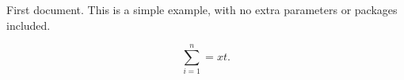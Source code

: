 \documentclass{article}
\begin{document}
First document. This is a simple example, with no 
extra parameters or packages included.

    \[
        \displaystyle\sum_{i=1}^{n} = xt
    .\] 
\end{document}
